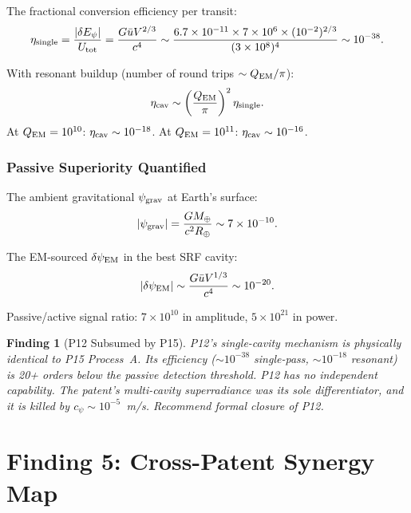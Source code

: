 \documentclass[11pt]{article}
\newtheorem{finding}{Finding}
\newcommand{\ee}[1]{\times 10^{#1}}
\begin{document}
The fractional conversion efficiency per transit:
\begin{equation}
\eta_{\rm single} = \frac{|\delta E_\psi|}{U_{\rm tot}}
= \frac{G \bar{u} V^{2/3}}{c^4}
\sim \frac{6.7\ee{-11} \times 7\ee{6} \times (10^{-2})^{2/3}}{(3\ee{8})^4}
\sim 10^{-38}.
\end{equation}

With resonant buildup (number of round trips $\sim Q_{\rm EM}/\pi$):
\begin{equation}
\eta_{\rm cav} \sim \left(\frac{Q_{\rm EM}}{\pi}\right)^2 \eta_{\rm single}.
\end{equation}
At $Q_{\rm EM} = 10^{10}$: $\eta_{\rm cav} \sim 10^{-18}$.
At $Q_{\rm EM} = 10^{11}$: $\eta_{\rm cav} \sim 10^{-16}$.

\section{Passive Superiority Quantified}

The ambient gravitational $\psi_{\rm grav}$ at Earth's surface:
\begin{equation}
|\psi_{\rm grav}| = \frac{GM_\oplus}{c^2 R_\oplus}
\sim 7\ee{-10}.
\end{equation}

The EM-sourced $\delta\psi_{\rm EM}$ in the best SRF cavity:
\begin{equation}
|\delta\psi_{\rm EM}| \sim \frac{G \bar{u} V^{1/3}}{c^4}
\sim 10^{-20}.
\end{equation}

Passive/active signal ratio: $7\ee{10}$ in amplitude, $5\ee{21}$ in power.

\begin{finding}[P12 Subsumed by P15]\label{find:P12-dead}
P12's single-cavity mechanism is physically identical to P15 Process~A.
Its efficiency ($\sim 10^{-38}$ single-pass, $\sim 10^{-18}$ resonant)
is 20+ orders below the passive detection threshold. P12 has no
independent capability. The patent's multi-cavity superradiance was
its sole differentiator, and it is killed by $c_\psi \sim 10^{-5}$~m/s.
Recommend formal closure of P12.
\end{finding}


\part{Finding 5: Cross-Patent Synergy Map}
\label{part:synergies}
\end{document}
